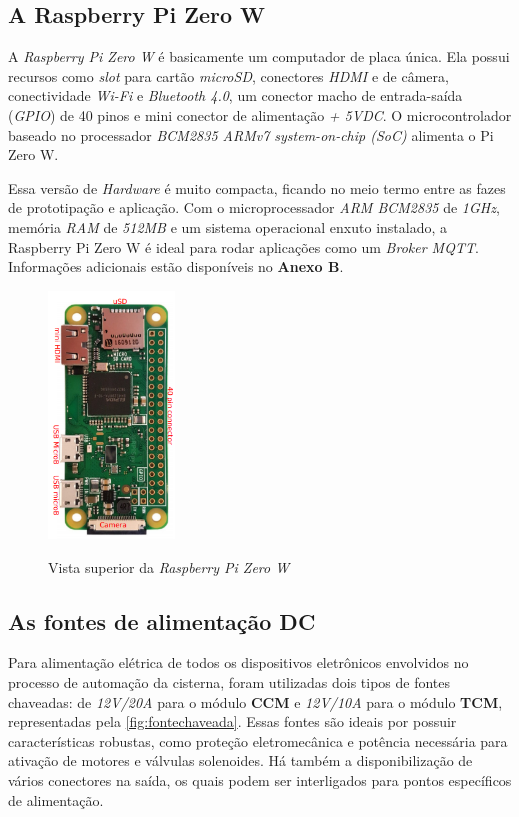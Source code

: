 \subsection{A Raspberry Pi Zero W}

A \textit{Raspberry Pi Zero W} é basicamente um computador de placa única. Ela possui recursos como \textit{slot} para cartão \textit{microSD}, conectores \textit{HDMI} e de câmera, conectividade \textit{Wi-Fi} e \textit{Bluetooth 4.0}, um conector macho de entrada-saída (\textit{GPIO}) de 40 pinos e mini conector de alimentação \textit{+ 5VDC}. O microcontrolador baseado no processador \textit{BCM2835 ARMv7 system-on-chip (SoC)} alimenta o Pi Zero W.

Essa versão de \textit{Hardware} é muito compacta, ficando no meio termo entre as fazes de prototipação e aplicação. Com o microprocessador \textit{ARM BCM2835} de \textit{1GHz}, memória \textit{RAM} de \textit{512MB} e um sistema operacional enxuto instalado, a Raspberry Pi Zero W é ideal para rodar aplicações como um \textit{Broker MQTT}. Informações adicionais estão disponíveis no \textbf{Anexo B}.

\begin{figure}[H]
	\centering
	\caption{Vista superior da \textit{Raspberry Pi Zero W}}
	\includegraphics[width=0.3\textwidth, angle = 90]{figuras/rasp_zerow.png}
	\label{fig:rasppizerow}
\end{figure} 

\subsection{As fontes de alimentação DC}

Para alimentação elétrica de todos os dispositivos eletrônicos envolvidos no processo de automação da cisterna, foram utilizadas dois tipos de fontes chaveadas: de \textit{12V/20A} para o módulo \textbf{CCM} e \textit{12V/10A} para o módulo \textbf{TCM}, representadas pela \autoref{fig:fontechaveada}. Essas fontes são ideais por possuir características robustas, como proteção eletromecânica e potência necessária para ativação de motores e válvulas solenoides. Há também a disponibilização de vários conectores na saída, os quais podem ser interligados para pontos específicos de alimentação.


